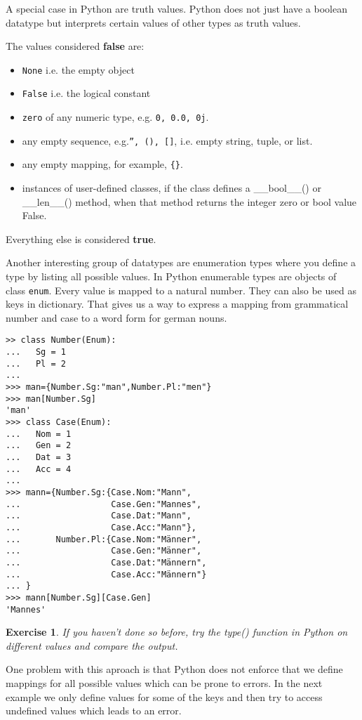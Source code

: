 \documentclass{scrartcl}
\newtheorem{exercise}{Exercise}
\begin{document}
A special case in Python are truth values. Python does not just have a boolean datatype but interprets certain values of other types as truth values.

The values considered \textbf{false} are: 
\begin{itemize}
\item \texttt{None} i.e. the empty object
\item \texttt{False} i.e. the logical constant
\item \texttt{zero} of any numeric type, e.g. \texttt{0, 0.0, 0j}.
\item any empty sequence, e.g.\texttt{'', (), []}, i.e. empty string, tuple, or list.
\item any empty mapping, for example, \texttt{\{\}}.
\item instances of user-defined classes, if the class defines a \_\_bool\_\_() or \_\_len\_\_() method, when that method returns the integer zero or bool value False.
\end{itemize}

Everything else is considered \textbf{true}.

Another interesting group of datatypes are enumeration types where you define a type by listing all possible values. In Python enumerable types are objects of class \texttt{enum}. Every value is mapped to a natural number. They can also be used as keys in dictionary. That gives us a way to express a mapping from grammatical number and case to a word form for german nouns.

\begin{verbatim}
>> class Number(Enum):
...   Sg = 1
...   Pl = 2
... 
>>> man={Number.Sg:"man",Number.Pl:"men"}
>>> man[Number.Sg]
'man'
>>> class Case(Enum):
...   Nom = 1
...   Gen = 2
...   Dat = 3
...   Acc = 4
... 
>>> mann={Number.Sg:{Case.Nom:"Mann", 
...                  Case.Gen:"Mannes", 
...                  Case.Dat:"Mann", 
...                  Case.Acc:"Mann"},
...       Number.Pl:{Case.Nom:"Männer", 
...                  Case.Gen:"Männer", 
...                  Case.Dat:"Männern", 
...                  Case.Acc:"Männern"}
... }
>>> mann[Number.Sg][Case.Gen]
'Mannes'
\end{verbatim}

\begin{exercise}
  If you haven't done so before, try the type() function in Python on different values and compare the output. 
\end{exercise}

One problem with this aproach is that Python does not enforce that we define mappings for all possible values which can be prone to errors. In the next example we only define values for some of the keys and then try to access undefined values which leads to an error.
\end{document}
